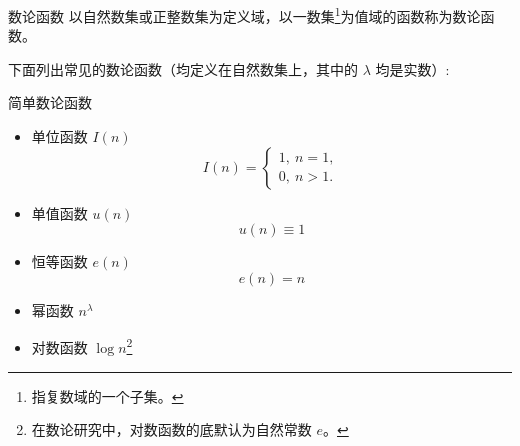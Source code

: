 

\begin{issues}
\issueDraft
\issueMissDepend
\end{issues}

\begin{definition}{数论函数}
以自然数集或正整数集为定义域，以一数集\footnote{指复数域的一个子集。}为值域的函数称为数论函数。
\end{definition}

下面列出常见的数论函数（均定义在自然数集上，其中的 $\lambda$ 均是实数）:
\begin{example}{简单数论函数}
\begin{itemize}
\item 单位函数 $I(n)$
\begin{equation}
I(n) =
\begin{cases}
1,\ n = 1,\\
0,\ n > 1.
\end{cases}
\end{equation}
\item 单值函数 $u(n)$
\begin{equation}
u(n)\equiv1
\end{equation}
\item 恒等函数 $e(n)$
\begin{equation}
e(n)=n
\end{equation}
\item 幂函数 $n^\lambda$
\item 对数函数 $\log n$\footnote{在数论研究中，对数函数的底默认为自然常数 $e$。}
\end{itemize}
\end{example}
